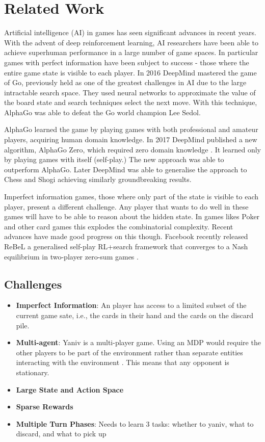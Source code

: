 \documentclass[../main.tex]{subfiles}
\begin{document}
\chapter{Related Work}
\label{cha:RelatedWork}

Artificial intelligence (AI) in games has seen significant advances in recent years. With the advent of deep reinforcement learning, AI researchers have been able to achieve superhuman performance in a large number of game spaces. In particular games with perfect information have been subject to success - those where the entire game state is visible to each player. In 2016 DeepMind \cite{silver_mastering_2016} mastered the game of Go, previously held as one of the greatest challenges in AI due to the large intractable search space. They used neural networks to approximate the value of the board state and search techniques select the next move. With this technique, AlphaGo was able to defeat the Go world champion Lee Sedol. 

AlphaGo learned the game by playing games with both professional and amateur players, acquiring human domain knowledge. In 2017 DeepMind published a new algorithm, AlphaGo Zero, which required zero domain knowledge \cite{silver_mastering_2017}. It learned only by playing games with itself (self-play.) The new approach was able to outperform AlphaGo. Later DeepMind \cite{silver_mastering_2017-1} was able to generalise the approach to Chess and Shogi achieving similarly groundbreaking results. 

Imperfect information games, those where only part of the state is visible to each player, present a different challenge. Any player that wants to do well in these games will have to be able to reason about the hidden state. In games likes Poker and other card games this explodes the combinatorial complexity. Recent advances have made good progress on this though. Facebook recently released ReBeL a generalised self-play RL+search framework that converges to a Nash equilibrium in two-player zero-sum games \cite{brown_combining_2020}. 


\section{Challenges} \label{challenges}
\begin{itemize}[nosep]
    \item \textbf{Imperfect Information}: An player has access to a limited subset of the current game sate, i.e., the cards in their hand and the cards on the discard pile. 
    \item \textbf{Multi-agent}: Yaniv is a multi-player game. Using an MDP would require the other players to be part of the environment rather than separate entities interacting with the environment \cite{littman_markov_1994}. This means that any opponent is stationary. 
   \item \textbf{Large State and Action Space}
   \item \textbf{Sparse Rewards}
   \item \textbf{Multiple Turn Phases}: Needs to learn 3 tasks: whether to yaniv, what to discard, and what to pick up
\end{itemize}
\end{document}
